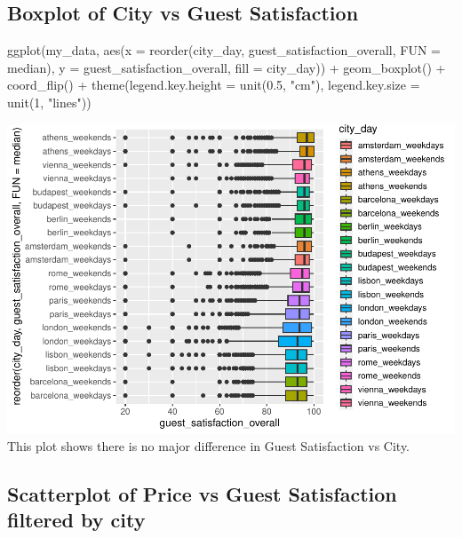 \documentclass[
]{article}
\newenvironment{Shaded}{\begin{snugshade}}{\end{snugshade}}
\newcommand{\AttributeTok}[1]{\textcolor[rgb]{0.77,0.63,0.00}{#1}}
\newcommand{\DecValTok}[1]{\textcolor[rgb]{0.00,0.00,0.81}{#1}}
\newcommand{\FloatTok}[1]{\textcolor[rgb]{0.00,0.00,0.81}{#1}}
\newcommand{\FunctionTok}[1]{\textcolor[rgb]{0.00,0.00,0.00}{#1}}
\newcommand{\NormalTok}[1]{#1}
\newcommand{\SpecialCharTok}[1]{\textcolor[rgb]{0.00,0.00,0.00}{#1}}
\newcommand{\StringTok}[1]{\textcolor[rgb]{0.31,0.60,0.02}{#1}}
\begin{document}
\hypertarget{boxplot-of-city-vs-guest-satisfaction}{%
\subsection{Boxplot of City vs Guest
Satisfaction}\label{boxplot-of-city-vs-guest-satisfaction}}

\begin{Shaded}
\begin{Highlighting}[]
\FunctionTok{ggplot}\NormalTok{(my\_data, }\FunctionTok{aes}\NormalTok{(}\AttributeTok{x =} \FunctionTok{reorder}\NormalTok{(city\_day, guest\_satisfaction\_overall,}
    \AttributeTok{FUN =}\NormalTok{ median), }\AttributeTok{y =}\NormalTok{ guest\_satisfaction\_overall, }\AttributeTok{fill =}\NormalTok{ city\_day)) }\SpecialCharTok{+}
    \FunctionTok{geom\_boxplot}\NormalTok{() }\SpecialCharTok{+} \FunctionTok{coord\_flip}\NormalTok{() }\SpecialCharTok{+} \FunctionTok{theme}\NormalTok{(}\AttributeTok{legend.key.height =} \FunctionTok{unit}\NormalTok{(}\FloatTok{0.5}\NormalTok{,}
    \StringTok{"cm"}\NormalTok{), }\AttributeTok{legend.key.size =} \FunctionTok{unit}\NormalTok{(}\DecValTok{1}\NormalTok{, }\StringTok{"lines"}\NormalTok{))}
\end{Highlighting}
\end{Shaded}

\includegraphics{Project_Prelim_report_files/figure-latex/unnamed-chunk-6-1.pdf}
This plot shows there is no major difference in Guest Satisfaction vs
City.

\hypertarget{scatterplot-of-price-vs-guest-satisfaction-filtered-by-city}{%
\subsection{Scatterplot of Price vs Guest Satisfaction filtered by
city}\label{scatterplot-of-price-vs-guest-satisfaction-filtered-by-city}}
\end{document}
